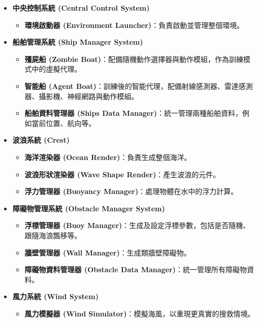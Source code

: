 \documentclass[12pt,a4paper]{article}
\begin{document}
\newpage

\begin{itemize}
	 \item \textbf{中央控制系統 (Central Control System)}
	\begin{itemize}
	    \item \textbf{環境啟動器 (Environment Launcher)}：負責啟動並管理整個環境。
	\end{itemize}
	
	 \item \textbf{船舶管理系統 (Ship Manager System)}
	\begin{itemize}
	    \item \textbf{殭屍船 (Zombie Boat)}：配備隨機動作選擇器與動作模組，作為訓練模式中的虛擬代理。
	    \item \textbf{智能船 (Agent Boat)}：訓練後的智能代理，配備射線感測器、雷達感測器、攝影機、神經網路與動作模組。
	    \item \textbf{船舶資料管理器 (Ships Data Manager)}：統一管理兩種船舶資料，例如當前位置、航向等。
	\end{itemize}
	
	 \item \textbf{波浪系統 (Crest)}
	\begin{itemize}
	    \item \textbf{海洋渲染器 (Ocean Render)}：負責生成整個海洋。
	    \item \textbf{波浪形狀渲染器 (Wave Shape Render)}：產生波浪的元件。
	    \item \textbf{浮力管理器 (Buoyancy Manager)}：處理物體在水中的浮力計算。
	\end{itemize}
	
	 \item \textbf{障礙物管理系統 (Obstacle Manager System)}
	\begin{itemize}
	    \item \textbf{浮標管理器 (Buoy Manager)}：生成及設定浮標參數，包括是否隨機、跟隨海浪飄移等。
	    \item \textbf{牆壁管理器 (Wall Manager)}：生成類牆壁障礙物。
	    \item \textbf{障礙物資料管理器 (Obstacle Data Manager)}：統一管理所有障礙物資料。
	\end{itemize}
	
	 \item \textbf{風力系統 (Wind System)}
	\begin{itemize}
	    \item \textbf{風力模擬器 (Wind Simulator)}：模擬海風，以重現更真實的搜救情境。
	\end{itemize}
	

\end{itemize}
\end{document}
